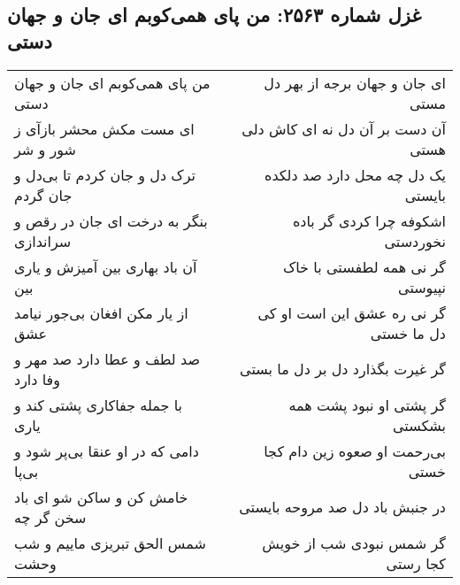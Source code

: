 \begin{center}
\section*{غزل شماره ۲۵۶۳: من پای همی‌کوبم ای جان و جهان دستی}
\label{sec:2563}
\begin{longtable}{l p{0.5cm} r}
من پای همی‌کوبم ای جان و جهان دستی
&&
ای جان و جهان برجه از بهر دل مستی
\\
ای مست مکش محشر بازآی ز شور و شر
&&
آن دست بر آن دل نه ای کاش دلی هستی
\\
ترک دل و جان کردم تا بی‌دل و جان گردم
&&
یک دل چه محل دارد صد دلکده بایستی
\\
بنگر به درخت ای جان در رقص و سراندازی
&&
اشکوفه چرا کردی گر باده نخوردستی
\\
آن باد بهاری بین آمیزش و یاری بین
&&
گر نی همه لطفستی با خاک نپیوستی
\\
از یار مکن افغان بی‌جور نیامد عشق
&&
گر نی ره عشق این است او کی دل ما خستی
\\
صد لطف و عطا دارد صد مهر و وفا دارد
&&
گر غیرت بگذارد دل بر دل ما بستی
\\
با جمله جفاکاری پشتی کند و یاری
&&
گر پشتی او نبود پشت همه بشکستی
\\
دامی که در او عنقا بی‌پر شود و بی‌پا
&&
بی‌رحمت او صعوه زین دام کجا خستی
\\
خامش کن و ساکن شو ای باد سخن گر چه
&&
در جنبش باد دل صد مروحه بایستی
\\
شمس الحق تبریزی ماییم و شب وحشت
&&
گر شمس نبودی شب از خویش کجا رستی
\\
\end{longtable}
\end{center}
